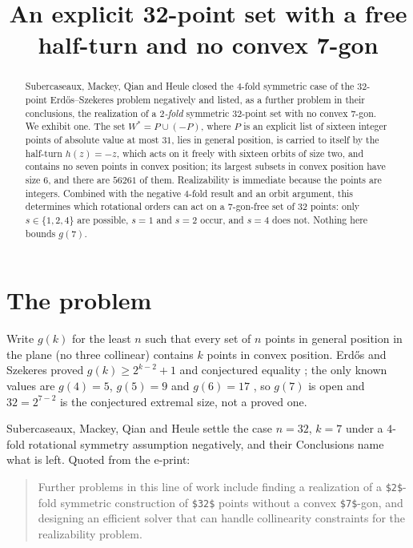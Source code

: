 \documentclass[11pt]{amsart}
\title[A 32-point set with a free half-turn and no convex 7-gon]
{An explicit 32-point set with a free half-turn and no convex 7-gon}
\date{}
\theoremstyle{remark}
\begin{document}
\begin{abstract}
Subercaseaux, Mackey, Qian and Heule closed the $4$-fold symmetric case of the
$32$-point Erd\H{o}s--Szekeres problem negatively and listed, as a further
problem in their conclusions, the realization of a \emph{$2$-fold} symmetric
$32$-point set with no convex $7$-gon. We exhibit one. The set
$W^{*}=P\cup(-P)$, where $P$ is an explicit list of sixteen integer points of
absolute value at most $31$, lies in general position, is carried to itself by
the half-turn $h(z)=-z$, which acts on it freely with sixteen orbits of size
two, and contains no seven points in convex position; its largest subsets in
convex position have size $6$, and there are $56261$ of them. Realizability is
immediate because the points are integers. Combined with the negative $4$-fold
result and an orbit argument, this determines which rotational orders can act on
a $7$-gon-free set of $32$ points: only $s\in\{1,2,4\}$ are possible, $s=1$ and
$s=2$ occur, and $s=4$ does not. Nothing here bounds $g(7)$.
\end{abstract}

\maketitle

\section{The problem}\label{sec:problem}

Write $g(k)$ for the least $n$ such that every set of $n$ points in general
position in the plane (no three collinear) contains $k$ points in convex
position. Erd\H{o}s and Szekeres proved $g(k)\ge 2^{k-2}+1$ and conjectured
equality \cite{ES35,ES61}; the only known values are $g(4)=5$, $g(5)=9$ and
$g(6)=17$ \cite{SzekeresPeters}, so $g(7)$ is open and $32=2^{7-2}$ is the
conjectured extremal size, not a proved one.

Subercaseaux, Mackey, Qian and Heule \cite{SMQH} settle the case $n=32$, $k=7$
under a $4$-fold rotational symmetry assumption negatively, and their
Conclusions name what is left. Quoted from the e-print:

\begin{quote}
Further problems in this line of work include finding a realization of a
\verb|$2$|-fold symmetric construction of \verb|$32$| points without a convex
\verb|$7$|-gon, and designing an efficient solver that can handle collinearity
constraints for the realizability problem.
\end{quote}
\end{document}
